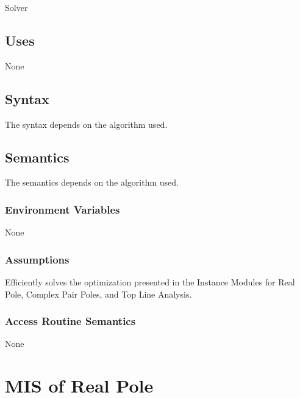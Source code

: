 \documentclass[12pt, titlepage]{article}
\begin{document}
Solver

\subsection{Uses}

None

\subsection{Syntax}

The syntax depends on the algorithm used.

\subsection{Semantics}

The semantics depends on the algorithm used.

\subsubsection{Environment Variables}

None

\subsubsection{Assumptions}

Efficiently solves the optimization presented in the Instance Modules
for Real Pole, Complex Pair Poles, and Top Line Analysis.


\subsubsection{Access Routine Semantics}

None


\newpage

\section{MIS of Real Pole} \label{sc:MIS_POLEREALSOLVERMODULE}
\end{document}
